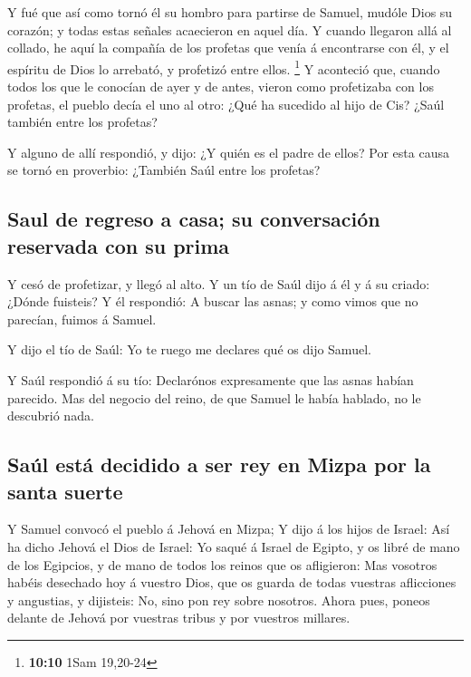  Y fué que así como tornó él su hombro para partirse de
Samuel, mudóle Dios su corazón; y todas estas señales acaecieron en
aquel día.  Y cuando llegaron allá al collado, he aquí la
compañía de los profetas que venía á encontrarse con él, y el espíritu
de Dios lo arrebató, y profetizó entre ellos. \footnote{\textbf{10:10}
  1Sam 19,20-24}  Y aconteció que, cuando todos los que
le conocían de ayer y de antes, vieron como profetizaba con los
profetas, el pueblo decía el uno al otro: ¿Qué ha sucedido al hijo de
Cis? ¿Saúl también entre los profetas?

 Y alguno de allí respondió, y dijo: ¿Y quién es el padre
de ellos? Por esta causa se tornó en proverbio: ¿También Saúl entre los
profetas?

\hypertarget{saul-de-regreso-a-casa-su-conversaciuxf3n-reservada-con-su-prima}{%
\subsection{Saul de regreso a casa; su conversación reservada con su
prima}\label{saul-de-regreso-a-casa-su-conversaciuxf3n-reservada-con-su-prima}}

 Y cesó de profetizar, y llegó al alto.  Y
un tío de Saúl dijo á él y á su criado: ¿Dónde fuisteis? Y él respondió:
A buscar las asnas; y como vimos que no parecían, fuimos á Samuel.

 Y dijo el tío de Saúl: Yo te ruego me declares qué os
dijo Samuel.

 Y Saúl respondió á su tío: Declarónos expresamente que
las asnas habían parecido. Mas del negocio del reino, de que Samuel le
había hablado, no le descubrió nada.

\hypertarget{sauxfal-estuxe1-decidido-a-ser-rey-en-mizpa-por-la-santa-suerte}{%
\subsection{Saúl está decidido a ser rey en Mizpa por la santa
suerte}\label{sauxfal-estuxe1-decidido-a-ser-rey-en-mizpa-por-la-santa-suerte}}

 Y Samuel convocó el pueblo á Jehová en Mizpa;
 Y dijo á los hijos de Israel: Así ha dicho Jehová el
Dios de Israel: Yo saqué á Israel de Egipto, y os libré de mano de los
Egipcios, y de mano de todos los reinos que os afligieron:
 Mas vosotros habéis desechado hoy á vuestro Dios, que os
guarda de todas vuestras aflicciones y angustias, y dijisteis: No, sino
pon rey sobre nosotros. Ahora pues, poneos delante de Jehová por
vuestras tribus y por vuestros millares.

